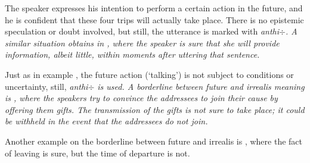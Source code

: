 

The speaker expresses his intention to perform a certain action in the future, and he is  confident that these four trips will actually take place. There is no epistemic speculation or doubt involved, but still, the utterance is marked with \em anthi$\div$\em. A similar situation obtains in , where the speaker is sure that she will provide information, albeit little, within moments after uttering that sentence.





Just as in   example , the future action (`talking') is not subject to conditions or uncertainty, still, \em anthi$\div$ \em is used. A borderline between future and irrealis  meaning is , where the speakers try to convince the addressees to join their cause by offering them gifts. The transmission of the gifts is not sure to take place; it could be withheld in the event that the addressees do not join.




Another example on the borderline between future and irrealis is , where the fact of leaving is sure, but the time of departure is not. 
 
